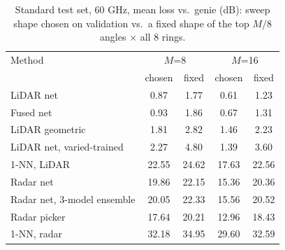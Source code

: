 \begin{table}[t]\centering\caption{Standard test set, 60 GHz, mean loss vs.\ genie (dB): sweep shape chosen on validation vs.\ a fixed shape of the top $M/8$ angles $\times$ all 8 rings.}\label{tab:fixed_shape}
\small\begin{tabular}{@{}lcccc@{}}\toprule
Method & \multicolumn{2}{c}{$M$=8} & \multicolumn{2}{c}{$M$=16} \\
 & chosen & fixed & chosen & fixed \\\midrule
LiDAR net & 0.87 & 1.77 & 0.61 & 1.23 \\
Fused net & 0.93 & 1.86 & 0.67 & 1.31 \\
LiDAR geometric & 1.81 & 2.82 & 1.46 & 2.23 \\
LiDAR net, varied-trained & 2.27 & 4.80 & 1.39 & 3.60 \\
1-NN, LiDAR & 22.55 & 24.62 & 17.63 & 22.56 \\
Radar net & 19.86 & 22.15 & 15.36 & 20.36 \\
Radar net, 3-model ensemble & 20.05 & 22.33 & 15.56 & 20.52 \\
Radar picker & 17.64 & 20.21 & 12.96 & 18.43 \\
1-NN, radar & 32.18 & 34.95 & 29.60 & 32.59 \\
\bottomrule\end{tabular}\end{table}
